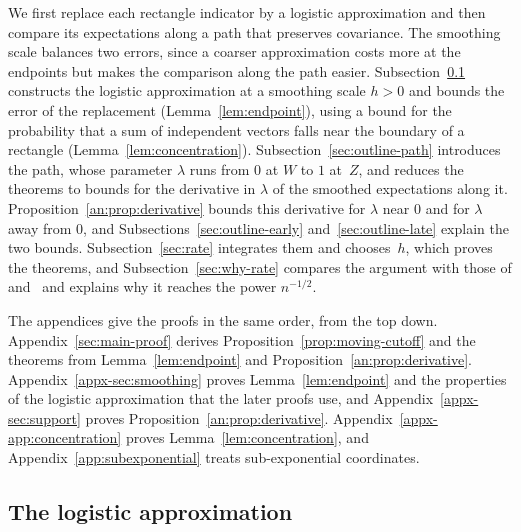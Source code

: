 \documentclass[11pt,letterpaper]{article}
\newif\ifshowpolish
\newcommand{\polish}[1]{\ifshowpolish{\color{magenta}%
\hypersetup{linkcolor=magenta,citecolor=magenta,urlcolor=magenta}#1}\else#1\fi}
\newif\ifshowrev
\newcommand{\rev}[1]{\ifshowrev{\color{revblue}%
\hypersetup{linkcolor=revblue,citecolor=revblue,urlcolor=revblue}#1}\else#1\fi}
\newcommand{\rs}[1]{\ifshowrev{\color{revblue}#1}\else#1\fi}
\newif\ifshowlin
\newcommand{\lin}[1]{\ifshowlin{\color{revblue}%
\hypersetup{linkcolor=revblue,citecolor=revblue,urlcolor=revblue}#1}\else#1\fi}
\newif\ifshowskill
\newcommand{\skl}[1]{\ifshowskill{\color{revblue}%
\hypersetup{linkcolor=revblue,citecolor=revblue,urlcolor=revblue}#1}\else#1\fi}
\newif\ifshownat
\newcommand{\nat}[1]{\ifshownat{\color{revblue}%
\hypersetup{linkcolor=revblue,citecolor=revblue,urlcolor=revblue}#1}\else#1\fi}
\theoremstyle{remark}
\begin{document}
\polish{We first replace each rectangle indicator by a logistic approximation
and then compare its expectations along a path that preserves covariance.
\rev{The smoothing scale balances two errors, since a coarser approximation
costs more at the endpoints but makes the comparison along the path easier.}}
\lin{Subsection~\ref{sec:outline-smoothing} constructs the logistic
approximation at a smoothing scale \(h>0\) and bounds the error of the
replacement (Lemma~\ref{lem:endpoint}), using a bound for the probability
that a sum of independent vectors falls near the boundary of a rectangle
(Lemma~\ref{lem:concentration}). Subsection~\ref{sec:outline-path}
introduces the path, whose parameter \(\lambda\) runs from \(0\) at \(W\)
to \(1\) at~\(Z\), and reduces the theorems to bounds for the derivative
in \(\lambda\) of the smoothed expectations along it.
Proposition~\ref{an:prop:derivative} bounds this derivative \skl{for
\(\lambda\) near \(0\) and for \(\lambda\) away from \(0\)}, and Subsections~\ref{sec:outline-early}
and~\ref{sec:outline-late} explain the two bounds.
Subsection~\ref{sec:rate} integrates them and chooses~\(h\), which proves
the theorems, and Subsection~\ref{sec:why-rate} compares the argument
with those of \nat{\cite{AL} and~\cite{GaoZhang}} and explains why it
reaches the power \(n^{-1/2}\).

The appendices give the proofs in the same order, from the top down.
Appendix~\ref{sec:main-proof} derives Proposition~\ref{prop:moving-cutoff}
and the theorems from Lemma~\ref{lem:endpoint} and
Proposition~\ref{an:prop:derivative}. Appendix~\ref{appx-sec:smoothing}
proves Lemma~\ref{lem:endpoint} and the properties of the logistic
approximation that the later proofs use, and
Appendix~\ref{appx-sec:support} proves
Proposition~\ref{an:prop:derivative}.
Appendix~\ref{appx-app:concentration} proves
Lemma~\ref{lem:concentration}, and Appendix~\ref{app:subexponential}
treats sub-exponential coordinates.}

\subsection{\texorpdfstring{\rs{The logistic approximation}}{The logistic approximation}}
\label{sec:outline-smoothing}
\end{document}
